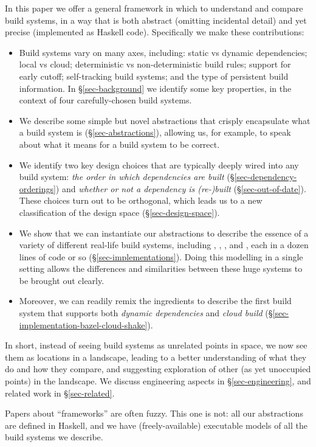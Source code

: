 In this paper we offer a general framework in which to understand
and compare build systems,
in a way that is both abstract (omitting incidental detail)
and yet precise (implemented as Haskell code).  Specifically we make
these contributions:
\begin{itemize}
\item Build systems vary on many axes, including:
static vs dynamic dependencies; local vs cloud; deterministic vs
non-deterministic build rules; support for early cutoff; self-tracking build
systems; and the type of persistent build information.
In \S\ref{sec-background} we identify some key properties, in the context of
four carefully-chosen build systems.
\item We describe some simple but novel abstractions that
  crisply encapsulate what a build system is (\S\ref{sec-abstractions}),
  allowing us, for example, to speak about what it means for a build system to be correct.

\item We identify two key design choices
  that are typically deeply wired into any build system:
  \emph{the order in which dependencies are built} (\S\ref{sec-dependency-orderings})
  and \emph{whether or not a dependency is (re-)built} (\S\ref{sec-out-of-date}).
  These choices turn out to be orthogonal, which leads us to a new
  classification of the design space (\S\ref{sec-design-space}).

\item We show that we can instantiate
our abstractions to describe the essence of a variety of different
real-life build systems, including \Make, \Shake, \Bazel, and \Excel, each in
a dozen lines of code or so (\S\ref{sec-implementations}).
Doing this modelling in a single setting allows
the differences and similarities between these huge systems to be
brought out clearly.

\item Moreover, we can readily remix the ingredients to describe the first
  build system that supports both \emph{dynamic dependencies}
  and \emph{cloud build} (\S\ref{sec-implementation-bazel-cloud-shake}).

\end{itemize}
In short, instead of seeing build systems as unrelated
points in space, we now see them as locations in a landscape,
leading to a better understanding of what they do and how they compare,
and suggesting exploration of other (as yet unoccupied points) in the
landscape.
We discuss engineering aspects in \S\ref{sec-engineering}, and related
work in \S\ref{sec-related}.

Papers about ``frameworks'' are often fuzzy.  This one is not: all our
abstractions are defined in Haskell, and we have (freely-available)
executable models of all the build systems we describe.
